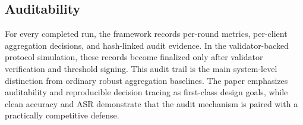 \documentclass[preprint,12pt]{elsarticle}
\begin{document}
\begin{table}[t]
\centering
\caption{Proposed-method ablation on Fashion-MNIST Non-IID. Values are mean $\pm$ standard deviation over three seeds; higher accuracy and lower ASR/loss are better.}
\label{tab:ablation}
\end{table}

\subsection{Auditability}

For every completed run, the framework records per-round metrics, per-client aggregation decisions, and hash-linked audit evidence. In the validator-backed protocol simulation, these records become finalized only after validator verification and threshold signing. This audit trail is the main system-level distinction from ordinary robust aggregation baselines. The paper emphasizes auditability and reproducible decision tracing as first-class design goals, while clean accuracy and ASR demonstrate that the audit mechanism is paired with a practically competitive defense.
\end{document}
